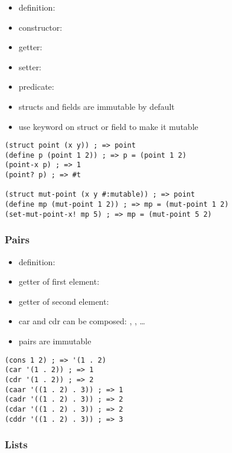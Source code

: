 \documentclass[a4paper,landscape,10pt]{article}
\begin{document}
\begin{multicols*}{2}
  \begin{itemize}
    \item definition: 
    \item constructor: 
    \item getter: 
    \item setter: 
    \item predicate: 
    \item structs and fields are immutable by default
    \item use  keyword on struct or field to make it mutable
  \end{itemize}

  \begin{lstlisting}[language=Racket]
(struct point (x y)) ; => point
(define p (point 1 2)) ; => p = (point 1 2)
(point-x p) ; => 1
(point? p) ; => #t

(struct mut-point (x y #:mutable)) ; => point
(define mp (mut-point 1 2)) ; => mp = (mut-point 1 2)
(set-mut-point-x! mp 5) ; => mp = (mut-point 5 2)
\end{lstlisting}

  \subsubsection{Pairs}

  \begin{itemize}
    \item definition: 
    \item getter of first element: 
    \item getter of second element: 
    \item car and cdr can be composed: , , \ldots
    \item pairs are immutable
  \end{itemize}

  \begin{lstlisting}[language=Racket]
(cons 1 2) ; => '(1 . 2)
(car '(1 . 2)) ; => 1
(cdr '(1 . 2)) ; => 2
(caar '((1 . 2) . 3)) ; => 1
(cadr '((1 . 2) . 3)) ; => 2
(cdar '((1 . 2) . 3)) ; => 2
(cddr '((1 . 2) . 3)) ; => 3
\end{lstlisting}

  \subsubsection{Lists}


\end{multicols*}
\end{document}
